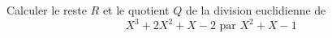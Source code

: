 Calculer le reste $R$ et le quotient $Q$ de la division euclidienne de
\begin{displaymath}
 {X}^{3}+2{X}^{2}+X-2 \text{ par } X^2+X-1
\end{displaymath}
\bigskip \bigskip